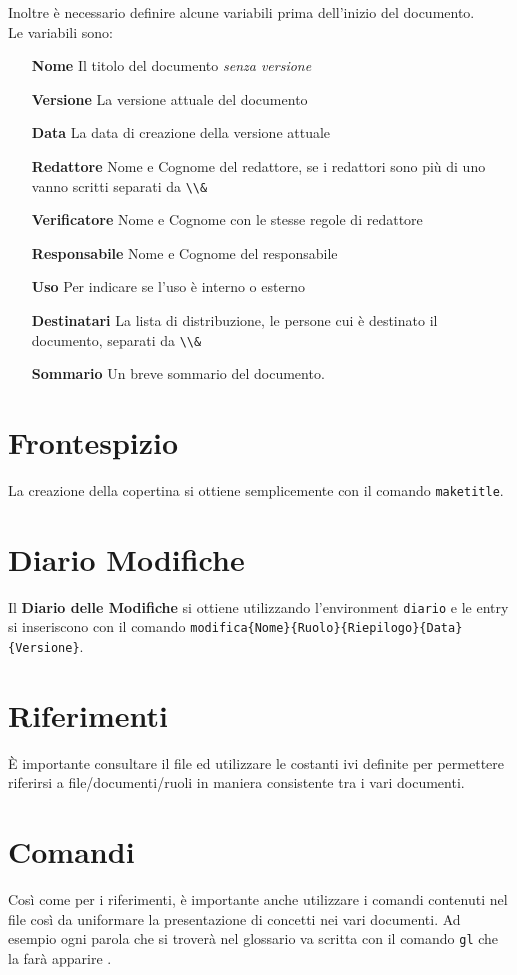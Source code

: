 \documentclass[a4paper,titlepage]{article}
\begin{document}
Inoltre è necessario definire alcune variabili prima dell'inizio del documento.\\
Le variabili sono:
\begin{itemize}
  \item[\textbf{Nome}] Il titolo del documento \textit{senza versione}
  \item[\textbf{Versione}] La versione attuale del documento
  \item[\textbf{Data}] La data di creazione della versione attuale
  \item[\textbf{Redattore}] Nome e Cognome del redattore, se i redattori sono più di uno vanno scritti separati da \texttt{\textbackslash \textbackslash \&}
  \item[\textbf{Verificatore}] Nome e Cognome con le stesse regole di redattore
  \item[\textbf{Responsabile}] Nome e Cognome del responsabile
  \item[\textbf{Uso}] Per indicare se l'uso è interno o esterno
  \item[\textbf{Destinatari}] La lista di distribuzione, le persone cui è destinato il documento, separati da \texttt{\textbackslash \textbackslash \&}
  \item[\textbf{Sommario}] Un breve sommario del documento.
\end{itemize}

\section{Frontespizio}
\label{sec:Frontespizio}

La creazione della copertina si ottiene semplicemente con il comando \texttt{maketitle}.

\section{Diario Modifiche}
\label{sec:DiarioModifiche}

Il \textbf{Diario delle Modifiche} si ottiene utilizzando l'environment \texttt{diario} e le entry si inseriscono con il comando \texttt{modifica\{Nome\}\{Ruolo\}\{Riepilogo\}\{Data\}\{Versione\}}.

\section{Riferimenti}
\label{sec:Riferimenti}

È importante consultare il file  ed utilizzare le costanti ivi definite per permettere riferirsi a file/documenti/ruoli in maniera consistente tra i vari documenti.

\section{Comandi}
\label{sec:Comandi}

Così come per i riferimenti, è importante anche utilizzare i comandi contenuti nel file  così da uniformare la presentazione di concetti nei vari documenti. Ad esempio ogni parola che si troverà nel glossario va scritta con il comando \texttt{gl} che la farà apparire .
\end{document}
